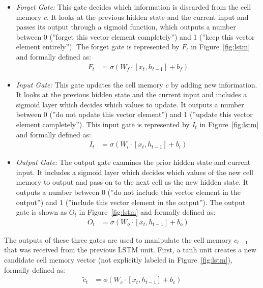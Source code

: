\begin{itemize}
\item \emph{Forget Gate:} This gate decides which information is discarded from the cell memory $c$. It looks at the previous hidden state and the current input and passes its output through a sigmoid function, which outputs a number between 0 (''forget this vector element completely'') and 1 (''keep this vector element entirely''). The forget gate is represented by $F_t$ in Figure~\ref{fig:lstm} and formally defined as:
\begin{align}
F_t &= \sigma (W_f \cdot [ x_t, h_{t-1}] + b_f) \label{eq:forget}
\end{align}
\item \emph{Input Gate:} This gate updates the cell memory $c$ by adding new information. It looks at the previous hidden state and the current input and includes a sigmoid layer which decides which values to update. It outputs a number between 0 (''do not update this vector element'') and 1 (''update this vector element completely''). This input gate is represented by $I_t$ in Figure~\ref{fig:lstm} and formally defined as:
\begin{align}
I_t &= \sigma (W_i \cdot [ x_t, h_{t-1}] + b_i) \label{eq:input}
\end{align}
\item \emph{Output Gate:} The output gate examines the prior hidden state and current input. It includes a sigmoid layer which decides which values of the new cell memory to output and pass on to the next cell as the new hidden state. It outputs a number between 0 (''do not include this vector element in the output'') and 1 (''include this vector element in the output''). The output gate is shown as $O_t$ in Figure~\ref{fig:lstm} and formally defined as:
\begin{align}
O_t &= \sigma (W_o \cdot [ x_t, h_{t-1}] + b_o) \label{eq:output}
\end{align}
\end{itemize}

The outputs of these three gates are used to manipulate the cell memory $c_{t-1}$ that was received from the previous LSTM unit. First, a tanh unit creates a new candidate cell memory vector (not explicitly labeled in Figure~\ref{fig:lstm}), formally defined as:
\begin{align}
\tilde{c}_t &= \phi (W_c \cdot [ x_t, h_{t-1}] + b_c) \label{eq:candidate}
\end{align}

